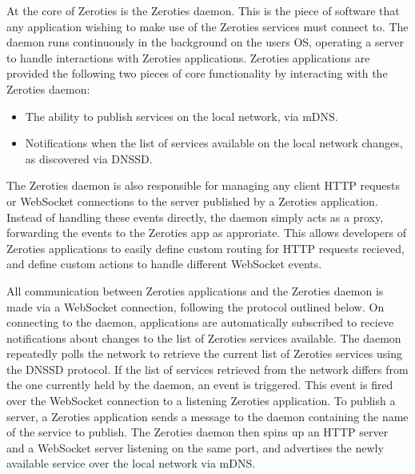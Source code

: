 At the core of Zeroties is the Zeroties daemon.
This is the piece of software that any application wishing to make use of the Zeroties services must connect to.
The daemon runs continuously in the background on the users OS, operating a server to handle interactions with Zeroties applications.
Zeroties applications are provided the following two pieces of core functionality by interacting with the Zeroties daemon:
\begin{itemize}
    \item The ability to publish services on the local network, via mDNS.
    \item Notifications when the list of services available on the local network changes, as discovered via DNSSD.
\end{itemize}
The Zeroties daemon is also responsible for managing any client HTTP requests or WebSocket connections to the server published by a Zeroties application.
Instead of handling these events directly, the daemon simply acts as a proxy, forwarding the events to the Zeroties app as approriate.
This allows developers of Zeroties applications to easily define custom routing for HTTP requests recieved, and define custom actions to handle different WebSocket events.

All communication between Zeroties applications and the Zeroties daemon is made via a WebSocket connection, following the protocol outlined below.
On connecting to the daemon, applications are automatically subscribed to recieve notifications about changes to the list of Zeroties services available.
The daemon repeatedly polls the network to retrieve the current list of Zeroties services using the DNSSD protocol.
If the list of services retrieved from the network differs from the one currently held by the daemon, an event is triggered.
This event is fired over the WebSocket connection to a listening Zeroties application.
To publish a server, a Zeroties application sends a message to the daemon containing the name of the service to publish.
The Zeroties daemon then spins up an HTTP server and a WebSocket server listening on the same port, and advertises the newly available service over the local network via mDNS.





